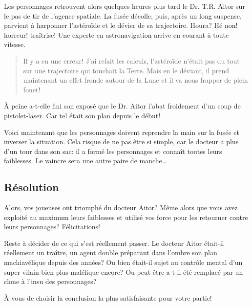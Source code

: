 Les personnages retrouvent alors quelques heures plus tard le Dr. T.R. Aitor sur le pas de tir de l'agence spatiale.
La fusée décolle, puis, après un long suspense, parvient à harponner l'astéroïde et le dévier de sa trajectoire.
Houra?
Hé non! horreur! traîtrise!
Une experte en astronavigation arrive en courant à toute vitesse.
\blockquote{Il y a eu une erreur! J'ai refait les calculs, l'astéroïde n'était pas du tout sur une trajectoire qui touchait la Terre. Mais en le déviant, il prend maintenant un effet fronde autour de la Lune et il va nous frapper de plein fouet!}
À peine a-t-elle fini son exposé que le Dr. Aitor l'abat froidement d'un coup de pistolet-laser.
Car tel était son plan depuis le début!

Voici maintenant que les personnages doivent reprendre la main sur la fusée et inverser la situation.
Cela risque de ne pas être si simple, car le docteur a plus d'un tour dans son sac: il a formé les personnages et connaît toutes leurs faiblesses.
Le vaincre sera une autre paire de manche\dots

\subsection{Résolution}

Alors, vos joueuses ont triomphé du docteur Aitor? Même alors que vous avez exploité au maximum leurs faiblesses et utilisé vos force pour les retourner contre leurs personnages?
Félicitations!

Reste à décider de ce qui s'est réellement passer. Le docteur Aitor était-il réellement un traître, un agent double préparant dans l'ombre son plan machiavélique depuis des années? Ou bien était-il sujet au contrôle mental d'un super-vilain bien plus maléfique encore? Ou peut-être a-t-il été remplacé par un clone à l'insu des personnages?

À vous de choisir la conclusion la plus satisfaisante pour votre partie!

\vfill
{}
\vfill
